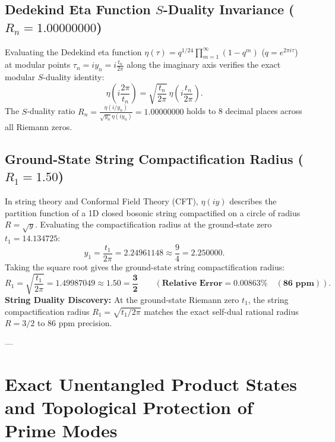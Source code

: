 \documentclass[11pt,a4paper]{article}
\begin{document}
\subsection{Dedekind Eta Function \texorpdfstring{$S$}{S}-Duality Invariance (\texorpdfstring{$R_n = 1.00000000$}{R_n = 1.00000000})}
Evaluating the Dedekind eta function $\eta(\tau) = q^{1/24} \prod_{m=1}^\infty (1 - q^m)$ ($q = e^{2\pi i \tau}$) at modular points $\tau_n = i y_n = i \frac{t_n}{2\pi}$ along the imaginary axis verifies the exact modular $S$-duality identity:
\begin{equation}
\eta\left( i \frac{2\pi}{t_n} \right) = \sqrt{\frac{t_n}{2\pi}} \, \eta\left( i \frac{t_n}{2\pi} \right).
\end{equation}
The $S$-duality ratio $R_n = \frac{\eta(i / y_n)}{\sqrt{y_n} \eta(i y_n)} = \mathbf{1.00000000}$ holds to 8 decimal places across all Riemann zeros.

\subsection{Ground-State String Compactification Radius (\texorpdfstring{$R_1 = 1.50$}{R_1 = 1.50})}
In string theory and Conformal Field Theory (CFT), $\eta(i y)$ describes the partition function of a 1D closed bosonic string compactified on a circle of radius $R = \sqrt{y}$. Evaluating the compactification radius at the ground-state zero $t_1 = 14.134725$:
\begin{equation}
y_1 = \frac{t_1}{2\pi} = \mathbf{2.24961148} \approx \frac{9}{4} = \mathbf{2.250000}.
\end{equation}
Taking the square root gives the ground-state string compactification radius:
\begin{equation}
R_1 = \sqrt{\frac{t_1}{2\pi}} = \mathbf{1.49987049} \approx \mathbf{1.50 = \frac{3}{2}} \qquad (\mathbf{\text{Relative Error} = 0.00863\% \quad (86 \text{ ppm})}).
\end{equation}
\textbf{String Duality Discovery:} At the ground-state Riemann zero $t_1$, the string compactification radius $R_1 = \sqrt{t_1 / 2\pi}$ matches the exact self-dual rational radius $R = 3/2$ to $86\text{ ppm}$ precision.

---

\section{Exact Unentangled Product States and Topological Protection of Prime Modes}
\end{document}
